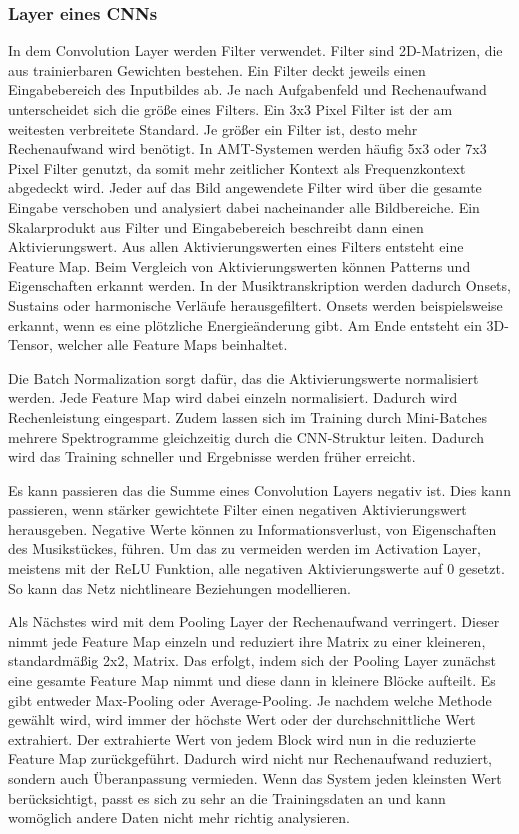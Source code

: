 \subsubsection{Layer eines CNNs}
In dem Convolution Layer werden Filter verwendet.
Filter sind 2D-Matrizen, die aus trainierbaren Gewichten bestehen.
Ein Filter deckt jeweils einen Eingabebereich des Inputbildes ab.
Je nach Aufgabenfeld und Rechenaufwand  unterscheidet sich die größe eines Filters.
Ein 3x3 Pixel Filter ist der am weitesten verbreitete Standard.
Je größer ein Filter ist, desto mehr Rechenaufwand wird benötigt.
In AMT-Systemen werden häufig 5x3 oder 7x3 Pixel Filter genutzt,
da somit mehr zeitlicher Kontext als Frequenzkontext abgedeckt wird.
Jeder auf das Bild angewendete Filter wird über die gesamte Eingabe verschoben und analysiert dabei nacheinander alle Bildbereiche.
Ein Skalarprodukt aus Filter und Eingabebereich beschreibt dann einen Aktivierungswert.
Aus allen Aktivierungswerten eines Filters entsteht eine Feature Map.
Beim Vergleich von Aktivierungswerten können Patterns und Eigenschaften erkannt werden.
In der Musiktranskription werden dadurch Onsets, Sustains oder harmonische Verläufe herausgefiltert.
Onsets werden beispielsweise erkannt, wenn es eine plötzliche Energieänderung gibt.
Am Ende entsteht ein 3D-Tensor, welcher alle Feature Maps beinhaltet.

Die Batch Normalization sorgt dafür, das die Aktivierungswerte normalisiert werden.
Jede Feature Map wird dabei einzeln normalisiert.
Dadurch wird Rechenleistung eingespart.
Zudem lassen sich im Training durch Mini-Batches mehrere Spektrogramme gleichzeitig durch die CNN-Struktur leiten.
Dadurch wird das Training schneller und Ergebnisse werden früher erreicht.

Es kann passieren das die Summe eines Convolution Layers negativ ist.
Dies kann passieren, wenn stärker gewichtete Filter einen negativen Aktivierungswert herausgeben.
Negative Werte können zu Informationsverlust, von Eigenschaften des Musikstückes, führen.
Um das zu vermeiden werden im Activation Layer, meistens mit der ReLU Funktion,
alle negativen Aktivierungswerte auf 0 gesetzt.
So kann das Netz nichtlineare Beziehungen modellieren.

Als Nächstes wird mit dem Pooling Layer der Rechenaufwand verringert.
Dieser nimmt jede Feature Map einzeln und reduziert ihre Matrix zu einer kleineren, standardmäßig 2x2, Matrix.
Das erfolgt, indem sich der Pooling Layer zunächst eine
gesamte Feature Map nimmt und diese dann in kleinere Blöcke aufteilt.
Es gibt entweder Max-Pooling oder Average-Pooling.
Je nachdem welche Methode gewählt wird, wird immer der höchste Wert oder der durchschnittliche Wert extrahiert.
Der extrahierte Wert von jedem Block wird nun in die reduzierte Feature Map zurückgeführt.
Dadurch wird nicht nur Rechenaufwand reduziert, sondern auch Überanpassung vermieden.
Wenn das System jeden kleinsten Wert berücksichtigt, passt es sich zu sehr an die Trainingsdaten an
und kann womöglich andere Daten nicht mehr richtig analysieren.

